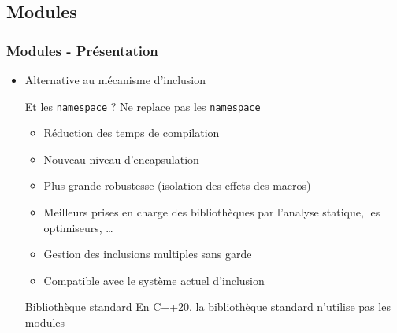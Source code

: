 \documentclass[C++.tex]{subfiles}
\begin{document}
\subsection*{Modules}
\begin{frame}[fragile]
	\frametitle{Modules - Présentation}
	\begin{itemize}

		\item Alternative au mécanisme d'inclusion

		\begin{alertblock}{Et les \lstinline|namespace| ?}
			Ne replace pas les \lstinline|namespace|
		\end{alertblock}

		\begin{itemize}
			\item Réduction des temps de compilation


			\item Nouveau niveau d'encapsulation
			\item Plus grande robustesse (isolation des effets des macros)
			\item Meilleurs prises en charge des bibliothèques par l'analyse statique, les optimiseurs, \ldots
			\item Gestion des inclusions multiples sans garde
			\item Compatible avec le système actuel d'inclusion

		\end{itemize}

		\begin{alertblock}{Bibliothèque standard}
			En C++20, la bibliothèque standard n'utilise pas les modules

		\end{alertblock}
	\end{itemize}
\end{frame}
\end{document}
